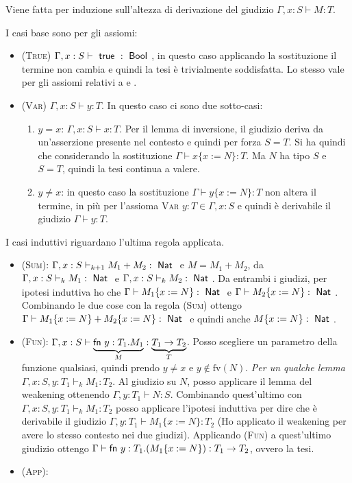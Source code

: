 Viene fatta per induzione sull'altezza di derivazione del giudizio $\Gamma , x : S \vdash M : T$.

I casi base sono per gli assiomi:

\begin{itemize}
	\item \textsc{(True)} $\Gamma , x : S \vdash \true : \Bool$, in questo caso applicando la sostituzione il termine  non cambia e quindi la tesi è trivialmente soddisfatta. Lo stesso vale per gli assiomi relativi a  e .
	\item \textsc{(Var)} $\Gamma , x : S \vdash y : T$. In questo caso ci sono due sotto-casi:
	\begin{enumerate}[a]
		\item $y = x$:  $\Gamma , x : S \vdash x : T$. Per il lemma di inversione, il giudizio deriva da un'asserzione presente nel contesto e quindi per forza $S = T$. Si ha quindi che considerando la sostituzione $\Gamma \vdash x\{x:=N\}:T $. Ma $N$ ha tipo $S$ e $S = T$, quindi la tesi continua a valere.
		\item $y \neq x$: in questo caso la sostituzione $\Gamma \vdash y\{x:=N\}:T $ non altera il termine, in più per l'assioma \textsc{Var} $y : T \in \Gamma, x :S$ e quindi è derivabile il giudizio $\Gamma \vdash y :T$.
	\end{enumerate}
\end{itemize}

\noindent I casi induttivi riguardano l'ultima regola applicata.

\begin{itemize}
	\item \textsc{(Sum)}: $\Gamma, x : S \vdash_{k+1} M_1 + M_2 : \Nat$ e $M = M_1 + M_2$, da $\Gamma, x : S \vdash_k M_1 :\Nat$ e $\Gamma, x : S \vdash_k M_2 :\Nat$. Da entrambi i giudizi, per ipotesi induttiva ho che $\Gamma \vdash M_1\{x := N\} : \Nat$ e $\Gamma \vdash M_2\{x := N\} : \Nat$. Combinando le due cose con la regola \textsc{(Sum)} ottengo $\Gamma \vdash M_1\{x := N\} + M_2\{x:=N\} : \Nat$ e quindi anche $M\{x:=N\}: \Nat$.
	\item \textsc{(Fun)}: $\Gamma, x: S \vdash \underbrace{\fn y : T_1 . M_1}_{M} : \underbrace{T_1 \rightarrow T_2}_{T}$. Posso scegliere un parametro della funzione qualsiasi, quindi prendo $y \neq x$ e $y \notin \text{fv}(N)$. \textit{Per un qualche lemma} $\Gamma, x: S, y:T_1 \vdash_k M_1:T_2$. Al giudizio su $N$, posso applicare il lemma del weakening ottenendo $\Gamma, y : T_1 \vdash N : S$. Combinando quest'ultimo con $\Gamma, x: S, y:T_1 \vdash_k M_1:T_2$ posso applicare l'ipotesi induttiva per dire che è derivabile il giudizio $\Gamma, y : T_1 \vdash M_1\{x:=N\} :T_2$ (Ho applicato il weakening per avere lo stesso contesto nei due giudizi). Applicando \textsc{(Fun)} a quest'ultimo giudizio ottengo $\Gamma \vdash \fn y : T_1 . (M_1\{x:=N\}):T_1\rightarrow T_2$, ovvero la tesi.
	
	\item \textsc{(App)}:  
\end{itemize}


